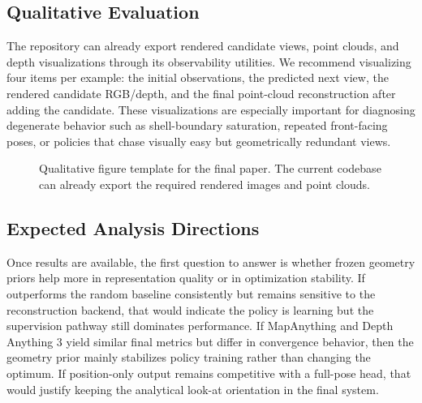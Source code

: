 \subsection{Qualitative Evaluation}
\label{sec:qualitative}

The repository can already export rendered candidate views, point clouds, and depth visualizations through its observability utilities. We recommend visualizing four items per example: the initial observations, the predicted next view, the rendered candidate RGB/depth, and the final point-cloud reconstruction after adding the candidate. These visualizations are especially important for diagnosing degenerate behavior such as shell-boundary saturation, repeated front-facing poses, or policies that chase visually easy but geometrically redundant views.

\begin{figure}[t]
    \centering
    \caption{Qualitative figure template for the final paper. The current codebase can already export the required rendered images and point clouds.}
    \label{fig:qualitative}
\end{figure}

\subsection{Expected Analysis Directions}
\label{sec:analysis}

Once results are available, the first question to answer is whether frozen geometry priors help more in representation quality or in optimization stability. If \method outperforms the random baseline consistently but remains sensitive to the reconstruction backend, that would indicate the policy is learning but the supervision pathway still dominates performance. If MapAnything and Depth Anything 3 yield similar final metrics but differ in convergence behavior, then the geometry prior mainly stabilizes policy training rather than changing the optimum. If position-only output remains competitive with a full-pose head, that would justify keeping the analytical look-at orientation in the final system.
